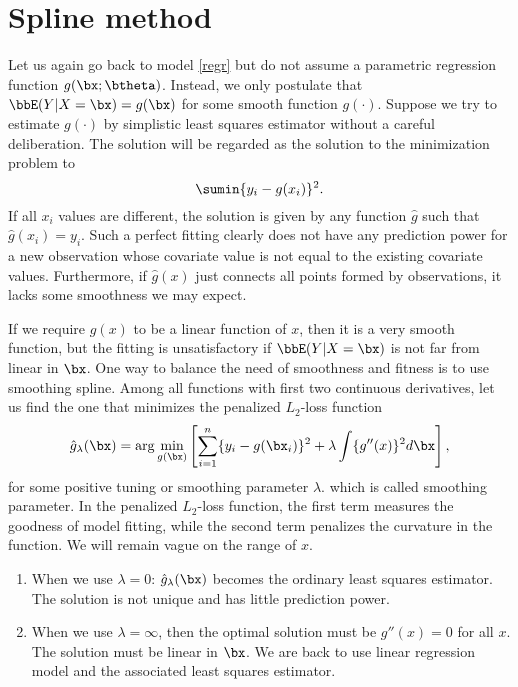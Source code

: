 \section{Spline method}
Let us again go back to model \eqref{regr} but do not assume a parametric
regression function $g(\bx; \btheta)$. Instead, we only postulate that
$\bbE(Y|X=\bx) = g(\bx)$ for some smooth function $g(\cdot)$.
Suppose we try to estimate $g(\cdot)$ by simplistic least
squares estimator without a careful deliberation. The solution
will be regarded as the solution to the minimization problem
to
\[
\sumin \{ y_i - g(x_i)\}^2.
\]
If all $x_i$ values are different, the solution is given by
any function $\hat g$ such that 
$\hat g(x_i) = y_i$. Such a perfect fitting clearly
does not have any prediction power for a new observation
whose covariate value is not equal to the existing covariate values.
Furthermore, if  $\hat g(x)$ just connects all points formed by
observations, it lacks some smoothness we may expect.

If we require $g(x)$ to be a linear function of $x$, then it
is a very smooth function, but the fitting 
is unsatisfactory if $\bbE(Y | X = \bx)$ is not far
from linear in $\bx$.
One way to balance the need of smoothness and fitness is
to use smoothing spline.
Among all functions with first two continuous 
derivatives, let us find the one that minimizes
the penalized $L_2$-loss function
\begin{equation}
\label{sm.spline}
\hat g_{\lambda}(\bx)
=
\arg\min_{ g(\bx)}
\left[
\sum_{i=1}^{n}\{y_i- g(\bx_i)\}^2
+
\lambda \int \{ g''(x)\}^2d\bx
\right],
\end{equation}
for some positive tuning or smoothing parameter $\lambda$.
which is called smoothing parameter. 
In the penalized $L_2$-loss function, 
the first term measures the goodness of model fitting, 
while the second term penalizes the curvature in the function.
We will remain vague on the range of $x$.

\begin{enumerate}
\item[] 
When we use $\lambda=0$: 
$\hat g_{\lambda}(\bx)$ becomes the ordinary least squares estimator.
The solution is not unique and has little prediction power.
\item[] 
When we use $\lambda=\infty$, then the optimal solution must be
$g''(x) = 0$ for all $x$. The solution must be linear in $\bx$.
We are back to use linear regression model and the associated
least squares estimator. 
\end{enumerate} 

